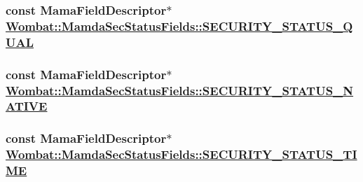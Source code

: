 \hypertarget{classWombat_1_1MamdaSecStatusFields_f95de09df2db9954afecc1d0e5c8a9ed}{
\subsubsection[SECURITY\_\-STATUS\_\-QUAL]{\setlength{\rightskip}{0pt plus 5cm}const Mama\-Field\-Descriptor$\ast$ \hyperlink{classWombat_1_1MamdaSecStatusFields_f95de09df2db9954afecc1d0e5c8a9ed}{Wombat::Mamda\-Sec\-Status\-Fields::SECURITY\_\-STATUS\_\-QUAL}}}
\label{classWombat_1_1MamdaSecStatusFields_f95de09df2db9954afecc1d0e5c8a9ed}


\hypertarget{classWombat_1_1MamdaSecStatusFields_165f4445e71a5b2390d1ea2dcbb5ee7e}{
\subsubsection[SECURITY\_\-STATUS\_\-NATIVE]{\setlength{\rightskip}{0pt plus 5cm}const Mama\-Field\-Descriptor$\ast$ \hyperlink{classWombat_1_1MamdaSecStatusFields_165f4445e71a5b2390d1ea2dcbb5ee7e}{Wombat::Mamda\-Sec\-Status\-Fields::SECURITY\_\-STATUS\_\-NATIVE}}}
\label{classWombat_1_1MamdaSecStatusFields_165f4445e71a5b2390d1ea2dcbb5ee7e}


\hypertarget{classWombat_1_1MamdaSecStatusFields_1ecf812ee874ff88684efce54ba3fcae}{
\subsubsection[SECURITY\_\-STATUS\_\-TIME]{\setlength{\rightskip}{0pt plus 5cm}const Mama\-Field\-Descriptor$\ast$ \hyperlink{classWombat_1_1MamdaSecStatusFields_1ecf812ee874ff88684efce54ba3fcae}{Wombat::Mamda\-Sec\-Status\-Fields::SECURITY\_\-STATUS\_\-TIME}}}
\label{classWombat_1_1MamdaSecStatusFields_1ecf812ee874ff88684efce54ba3fcae}


